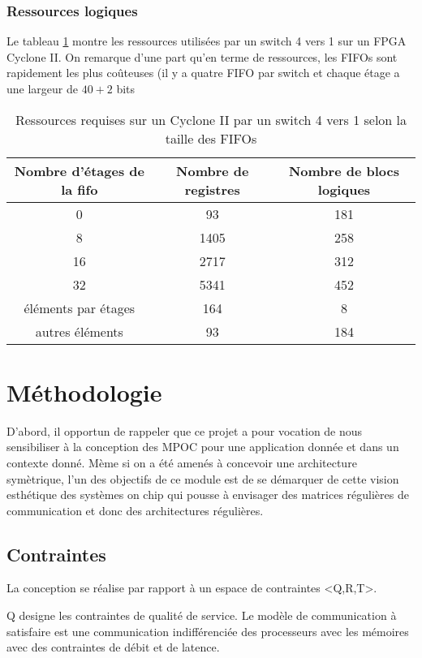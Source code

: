 \documentclass[11pt]{article}
\begin{document}
\subsubsection{Ressources logiques}
Le tableau \ref{perfs-sw-4} montre les ressources utilisées par un switch 4 vers 1 sur un FPGA Cyclone II. On remarque d'une part qu'en terme de ressources, les FIFOs sont rapidement les plus coûteuses (il y a quatre FIFO par switch et chaque étage a une largeur de $40+2$ bits

\begin{table}
\centering
\begin{tabular}{|c|c|c|}
\hline
Nombre d'étages de la fifo & Nombre de registres & Nombre de blocs logiques \\
\hline
0 & 93 & 181 \\
8 & 1405 & 258 \\
16 &  2717 & 312 \\
32 & 5341 & 452 \\
\hline \hline
éléments par étages & 164 & 8 \\
autres éléments & 93 & 184 \\
\hline
\end{tabular}
\caption{Ressources requises sur un Cyclone II par un switch 4 vers 1 selon la taille des FIFOs}
\label{perfs-sw-4}
\end{table}

\section{Méthodologie}

D'abord, il opportun de rappeler que ce projet a pour vocation de nous sensibiliser à la conception des MPOC pour une application donnée et dans un contexte donné. Mème si on a été amenés à concevoir une architecture symètrique, l'un des objectifs de ce module est de se démarquer de cette vision esthétique des systèmes on chip qui pousse à envisager des matrices régulières de communication et donc des architectures régulières.  

\subsection{Contraintes}

La conception se réalise par rapport à un espace de contraintes <Q,R,T>. 

Q designe les contraintes de qualité de service. Le modèle de communication à satisfaire est une communication indifférenciée des processeurs avec les mémoires avec des contraintes de débit et de latence.
\end{document}
